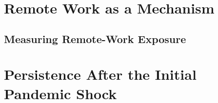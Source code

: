 \documentclass[11pt]{article}
\begin{document}
\section{Remote Work as a Mechanism}

%
%
%
%
%
%


\subsection{Measuring Remote-Work Exposure}

%
%
%


\section{Persistence After the Initial Pandemic Shock}

%
%
%
%
%
%
\end{document}
